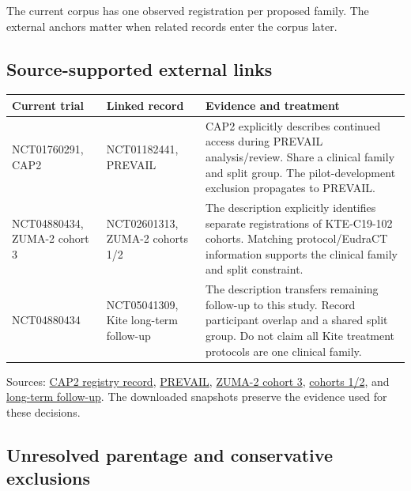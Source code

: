 \documentclass[10pt,letterpaper]{article}
\begin{document}
The current corpus has one observed registration per proposed family. The external anchors matter when related records enter the corpus later.

\subsection{Source-supported external links}\label{audit-source-supported-external-links}

\begin{longtable}{L{.20\linewidth}L{.34\linewidth}L{.34\linewidth}}
\toprule\noalign{}
Current trial & Linked record & Evidence and treatment \\
\midrule\noalign{}
\endhead
\bottomrule\noalign{}
\endlastfoot
NCT01760291, CAP2 & NCT01182441, PREVAIL & CAP2 explicitly describes continued access during PREVAIL analysis/review. Share a clinical family and split group. The pilot-development exclusion propagates to PREVAIL. \\
NCT04880434, ZUMA-2 cohort 3 & NCT02601313, ZUMA-2 cohorts 1/2 & The description explicitly identifies separate registrations of KTE-C19-102 cohorts. Matching protocol/EudraCT information supports the clinical family and split constraint. \\
NCT04880434 & NCT05041309, Kite long-term follow-up & The description transfers remaining follow-up to this study. Record participant overlap and a shared split group. Do not claim all Kite treatment protocols are one clinical family. \\
\end{longtable}

Sources: \href{https://clinicaltrials.gov/api/v2/studies/NCT01760291}{CAP2 registry record}, \href{https://clinicaltrials.gov/api/v2/studies/NCT01182441}{PREVAIL}, \href{https://clinicaltrials.gov/api/v2/studies/NCT04880434}{ZUMA-2 cohort 3}, \href{https://clinicaltrials.gov/api/v2/studies/NCT02601313}{cohorts 1/2}, and \href{https://clinicaltrials.gov/api/v2/studies/NCT05041309}{long-term follow-up}. The downloaded snapshots preserve the evidence used for these decisions.

\subsection{Unresolved parentage and conservative exclusions}\label{audit-unresolved-parentage-and-conservative-exclusions}
\end{document}
